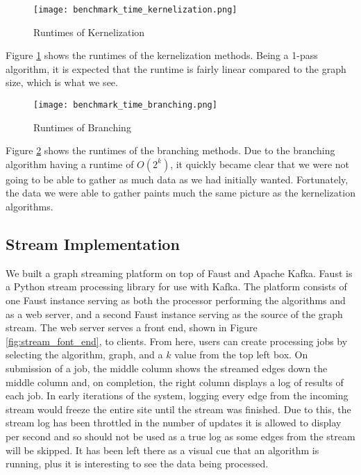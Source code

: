 \begin{figure}[htb]
    \centering
    \texttt{[image: benchmark\_time\_kernelization.png]}
    \caption{Runtimes of Kernelization}
    \label{fig:benchmark_time_kernelization}
\end{figure}

Figure \ref{fig:benchmark_time_kernelization} shows the runtimes of the
kernelization methods. Being a 1-pass algorithm, it is expected that the
runtime is fairly linear compared to the graph size, which is what we see.

\begin{figure}[htb]
    \centering
    \texttt{[image: benchmark\_time\_branching.png]}
    \caption{Runtimes of Branching}
    \label{fig:benchmark_time_branching}
\end{figure}

Figure \ref{fig:benchmark_time_branching} shows the runtimes of the branching
methods. Due to the branching algorithm having a runtime of \(O(2^k)\), it
quickly became clear that we were not going to be able to gather as much data as
we had initially wanted. Fortunately, the data we were able to gather paints
much the same picture as the kernelization algorithms.

\subsection{Stream Implementation}

We built a graph streaming platform on top of Faust and Apache Kafka. Faust is
a Python stream processing library for use with Kafka. The platform consists of
one Faust instance serving as both the processor performing the algorithms and
as a web server, and a second Faust instance serving as the source of the graph
stream. The web server serves a front end, shown in Figure
\ref{fig:stream_font_end}, to clients. From here, users can create processing
jobs by selecting the algorithm, graph, and a \(k\) value from the top left
box. On submission of a job, the middle column shows the streamed edges down
the middle column and, on completion, the right column displays a log of
results of each job. In early iterations of the system, logging every edge from
the incoming stream would freeze the entire site until the stream was finished.
Due to this, the stream log has been throttled in the number of updates it is
allowed to display per second and so should not be used as a true log as some
edges from the stream will be skipped. It has been left there as a visual cue
that an algorithm is running, plus it is interesting to see the data being
processed.


